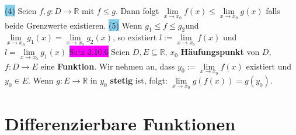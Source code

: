 \documentclass[landscape, 10pt]{article}
\newcommand{\R}{\mathbb{R}}
\begin{document}
\begin{multicols}{3}
         \colorbox{SkyBlue}{(4)} Seien
                \textcolor{NavyBlue}{$f,g:D\longrightarrow\R$} mit 
                \textcolor{NavyBlue}{$f\leqslant g$}. Dann folgt 
                \textcolor{NavyBlue}{
                $\lim\limits_{x\to x_0}f(x)\leqslant\lim\limits_{x\to x_0}g(x)$}
                falls beide Grenzwerte existieren. 
         \colorbox{SkyBlue}{(5)} Wenn 
                \textcolor{NavyBlue}{$g_1\leqslant f\leqslant g_2$}und 
                \textcolor{NavyBlue}{
                $\lim\limits_{x\to x_0}g_1(x)=\lim\limits_{x\to x_0}g_2(x)$}, 
                so existiert \textcolor{NavyBlue}{$l:=\lim\limits_{x\to x_0}f(x)$} und 
                \textcolor{NavyBlue}{$l=\lim\limits_{x\to x_0}g_1(x)$}
\colorbox{magenta}{Satz 3.10.6} Seien \textcolor{NavyBlue}{$D,E\subseteq\R,\,x_0$} 
                \textbf{Häufungspunkt} von 
                \textcolor{NavyBlue}{$D$},\,\textcolor{NavyBlue}{$f:D\longrightarrow E$} 
                eine \textbf{Funktion}. Wir nehmen an, dass 
         \textcolor{NavyBlue}{$y_0:=\lim\limits_{x\to x_0}f(x)$} existiert und 
                \textcolor{NavyBlue}{$y_0\in E$}. Wenn 
                \textcolor{NavyBlue}{$g:E\longrightarrow\R$} in 
                \textcolor{NavyBlue}{$y_0$} \textbf{stetig} ist, folgt: 
                \textcolor{NavyBlue}{$\lim\limits_{x\to x_0}g(f(x))=g(y_0)$}.

\section{Differenzierbare Funktionen}

\end{multicols}
\end{document}
